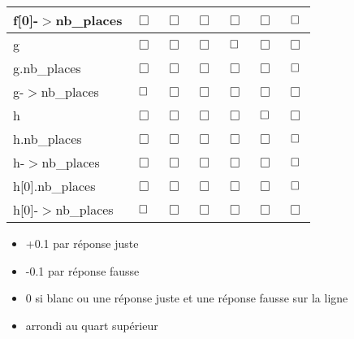 \documentclass[10pt]{article}
\newcommand{\BoxRep}{\ifcorrection{\boxtimes}{\Box}}
\begin{document}
\begin{Exercice}
\begin{minipage}{.7\linewidth}
\begin{tabular}{|l|c|c|c|c|c|c|}
  f[0]-$>$nb\_places & $\Box$ & $\Box$ & $\Box$ & $\Box$ & $\Box$ & $\BoxRep$\\\hline
  g & $\Box$ & $\Box$ & $\Box$ & $\BoxRep$ & $\Box$ & $\Box$\\\hline
  g.nb\_places    & $\Box$ & $\Box$ & $\Box$ & $\Box$ & $\Box$ & $\BoxRep$\\\hline
  g-$>$nb\_places & $\BoxRep$ & $\Box$ & $\Box$ & $\Box$ & $\Box$ & $\Box$\\\hline
  h & $\Box$ & $\Box$ & $\Box$ & $\Box$ & $\BoxRep$ & $\Box$\\\hline
  h.nb\_places    & $\Box$ & $\Box$ & $\Box$ & $\Box$ & $\Box$ & $\BoxRep$\\\hline
  h-$>$nb\_places & $\Box$ & $\Box$ & $\Box$ & $\Box$ & $\Box$ & $\BoxRep$\\\hline
  h[0].nb\_places    & $\Box$ & $\Box$ & $\Box$ & $\Box$ & $\Box$ & $\BoxRep$\\\hline
  h[0]-$>$nb\_places & $\BoxRep$ & $\Box$ & $\Box$ & $\Box$ & $\Box$ & $\Box$\\\hline
\end{tabular}
\end{minipage}
\begin{Reponse}
  \begin{itemize}
  \item +0.1 par réponse juste
  \item -0.1 par réponse fausse
  \item 0 si blanc ou une réponse juste et une réponse fausse sur la ligne
  \item arrondi au quart supérieur
  \end{itemize}
\end{Reponse}


\end{Exercice}
\end{document}
